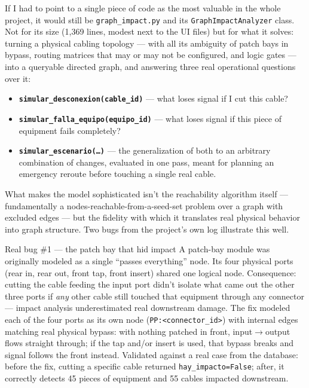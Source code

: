 \documentclass[10.4pt,twocolumn]{article}
\begin{document}
If I had to point to a single piece of code as the most valuable in the whole project, it would still be \texttt{graph\_impact.py} and its \texttt{GraphImpactAnalyzer} class. Not for its size (1{,}369 lines, modest next to the UI files) but for what it solves: turning a physical cabling topology --- with all its ambiguity of patch bays in bypass, routing matrices that may or may not be configured, and logic gates --- into a queryable directed graph, and answering three real operational questions over it:

\begin{itemize}[leftmargin=1.0em]
\item \textbf{\texttt{simular\_desconexion(cable\_id)}} --- what loses signal if I cut this cable?
\item \textbf{\texttt{simular\_falla\_equipo(equipo\_id)}} --- what loses signal if this piece of equipment fails completely?
\item \textbf{\texttt{simular\_escenario(\ldots)}} --- the generalization of both to an arbitrary combination of changes, evaluated in one pass, meant for planning an emergency reroute before touching a single real cable.
\end{itemize}

What makes the model sophisticated isn't the reachability algorithm itself --- fundamentally a nodes-reachable-from-a-seed-set problem over a graph with excluded edges --- but the fidelity with which it translates real physical behavior into graph structure. Two bugs from the project's own log illustrate this well.

\begin{bugbox}{Real bug \#1 --- the patch bay that hid impact}
A patch-bay module was originally modeled as a single ``passes everything'' node. Its four physical ports (rear in, rear out, front tap, front insert) shared one logical node. Consequence: cutting the cable feeding the input port didn't isolate what came out the other three ports if \emph{any} other cable still touched that equipment through any connector --- impact analysis underestimated real downstream damage. The fix modeled each of the four ports as its own node (\texttt{PP:<connector\_id>}) with internal edges matching real physical bypass: with nothing patched in front, input$\to$output flows straight through; if the tap and/or insert is used, that bypass breaks and signal follows the front instead. Validated against a real case from the database: before the fix, cutting a specific cable returned \texttt{hay\_impacto=False}; after, it correctly detects 45 pieces of equipment and 55 cables impacted downstream.
\end{bugbox}
\end{document}
